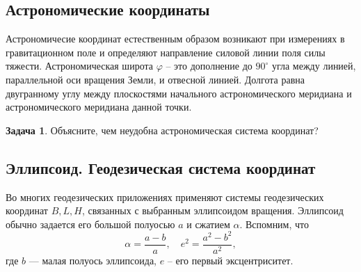 \documentclass[11pt, a4paper]{article}
\theoremstyle{plain}
\theoremstyle{definition}
\newtheorem{problem}{Задача}[section]
\theoremstyle{remark}
\renewcommand{\phi}{\ensuremath{\varphi}}
\begin{document}
\subsection{Астрономические  координаты}
Астрономичесие координат естественным образом возникают при измерениях в гравитационном поле и
определяют направление силовой линии поля силы тяжести.
Астрономическая широта $\phi$ -- это дополнение до $90^\circ$ угла между линией, параллельной оси
вращения Земли, и отвесной линией. Долгота равна двугранному углу между плоскостями начального
астрономического меридиана и астрономического меридиана данной точки.
\begin{problem}
    Объясните, чем неудобна астрономическая система координат?
\end{problem}

\subsection{Эллипсоид. Геодезическая система координат}
Во многих геодезических приложениях применяют системы геодезических координат $B, L, H$, 
связанных с выбранным
эллипсоидом вращения. Эллипсоид обычно задается его большой полуосью $a$ и сжатием $\alpha$.
Вспомним, что 
\begin{equation*}
    \alpha = \frac{a - b}{a},\quad e^2 = \frac{a^2 - b^2}{a^2},
\end{equation*}
где $b$ --- малая полуось эллипсоида, $e$ -- его первый эксцентриситет. 
\end{document}
